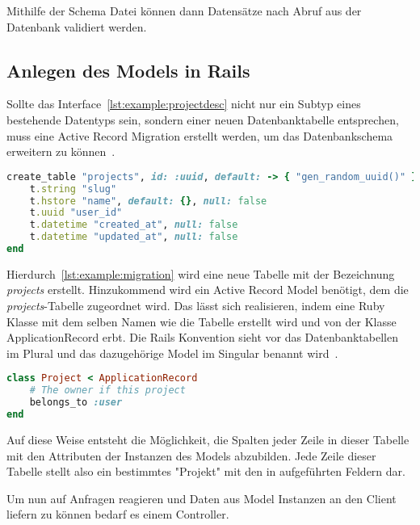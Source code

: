 Mithilfe der Schema Datei können dann Datensätze nach Abruf aus der Datenbank validiert werden.

\subsection{Anlegen des Models in Rails}
\label{sec:requirements:example:model}

Sollte das Interface~\ref{lst:example:projectdesc} nicht nur ein Subtyp eines bestehende Datentyps sein,
sondern einer neuen Datenbanktabelle entsprechen, muss eine Active Record Migration erstellt werden,
um das Datenbankschema erweitern zu können~\cite{rails-migration}.

\begin{lstlisting}[language=Ruby,float=h!,caption={Rails Migration zum hinzufügen einer \emph{projects} Datenbanktabelle}, label={lst:example:migration}]
create_table "projects", id: :uuid, default: -> { "gen_random_uuid()" }, force: :cascade do |t|
    t.string "slug"
    t.hstore "name", default: {}, null: false
    t.uuid "user_id"
    t.datetime "created_at", null: false
    t.datetime "updated_at", null: false
end
\end{lstlisting}

Hierdurch~\ref{lst:example:migration} wird eine neue Tabelle mit der Bezeichnung \emph{projects} erstellt.
Hinzukommend wird ein Active Record Model benötigt, dem die \emph{projects}-Tabelle zugeordnet wird.
Das lässt sich realisieren, indem eine Ruby Klasse mit dem selben Namen wie die Tabelle erstellt wird und
von der Klasse ApplicationRecord erbt.
Die Rails Konvention sieht vor das Datenbanktabellen im Plural und das dazugehörige Model im Singular benannt wird~\cite{rails-naming-convention}.

\begin{lstlisting}[language=Ruby,float=h!,caption={Model}, label={lst:example:model}]
class Project < ApplicationRecord
    # The owner if this project
    belongs_to :user
end
\end{lstlisting}

Auf diese Weise entsteht die Möglichkeit, die Spalten jeder Zeile in dieser Tabelle mit den Attributen der Instanzen des Models abzubilden.
Jede Zeile dieser Tabelle stellt also ein bestimmtes "Projekt" mit den in  aufgeführten Feldern dar.

Um nun auf Anfragen reagieren und Daten aus Model Instanzen an den Client liefern zu können bedarf es einem Controller.

